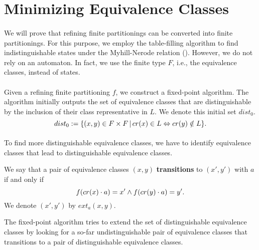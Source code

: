 \section{Minimizing Equivalence Classes}

\paragraph{}
We will prove that refining finite partitionings can be converted into finite partitionings. 
For this purpose, we employ the table-filling algorithm to find indistinguishable states under the Myhill-Nerode relation (\cite{DBLP:books/daglib/0011126}).
However, we do not rely on an automaton. 
In fact, we use the finite type $F$, i.e., the equivalence classes, instead of states.

\paragraph{}
Given a refining finite partitioning $f$, we construct a fixed-point algorithm.
The algorithm initially outputs the set of equivalence classes that are distinguishable by the inclusion of their class representative in $L$. 
We denote this initial set $dist_0$.
\begin{equation*}
    dist_0 := \{ (x,y)  \in F \times F \, | \, cr(x) \in L \Leftrightarrow cr(y) \notin L\}.
\end{equation*}

\paragraph{}
To find more distinguishable equivalence classes, we have to identify equivalence classes that lead to distinguishable equivalence classes. 
\begin{definition}
    We say that a pair of equivalence classes $(x,y)$ \textbf{transitions} to $(x', y')$ with $a$ if and only if
    \begin{equation*}
        f (cr(x)\cdot a) = x' \wedge f (cr(y) \cdot a) = y'.
    \end{equation*}
    We denote $(x', y')$ by $ext_a(x,y)$.
\end{definition}

The fixed-point algorithm tries to extend the set of distinguishable equivalence classes by looking for a so-far undistinguishable pair of equivalence classes that transitions to a pair of distinguishable equivalence classes.

